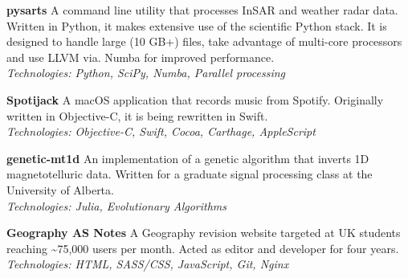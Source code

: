 %
\textbf{pysarts}  \newline
A command line utility that processes InSAR and weather radar data. Written in
Python, it makes extensive use of the scientific Python stack. It is designed to
handle large (10 GB+) files, take advantage of multi-core processors and use
LLVM via. Numba for improved performance. \\
\emph{Technologies: Python, SciPy, Numba, Parallel processing}

\medskip
\textbf{Spotijack}  \newline
A macOS application that records music from Spotify. Originally written in
Objective-C, it is being rewritten in Swift.\\
\emph{Technologies: Objective-C, Swift, Cocoa, Carthage, AppleScript}

\medskip
\textbf{genetic-mt1d}  \newline
An implementation of a genetic algorithm that inverts 1D magnetotelluric
data. Written for a graduate signal processing class at the University of
Alberta. \\
\emph{Technologies: Julia, Evolutionary Algorithms}

\medskip
\textbf{Geography AS Notes}  \newline
A Geography revision website targeted at UK students reaching
\textasciitilde{}75,000 users per month. Acted as editor and developer for
four years. \\
\emph{Technologies: HTML, SASS/CSS, JavaScript, Git, Nginx}

\bigskip

